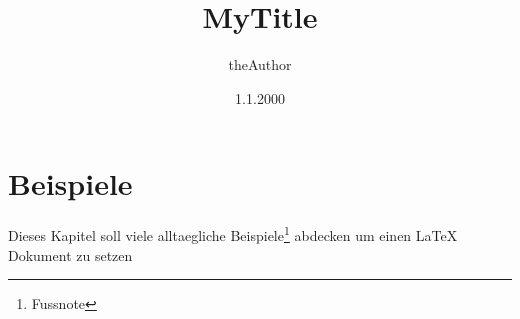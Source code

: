 \documentclass[a4paper,12pt,headsepline]{report}
\title{MyTitle}
\author{theAuthor}
\date{1.1.2000}
\begin{document}

 
 
 
 
 
\tableofcontents %

\listoffigures

\listoftables

\renewcommand{\lstlistlistingname}{Listingverzeichnis}
\lstlistoflistings

\pagestyle{plain} %




	


\chapter{Beispiele}
\label{cha:beispiele}
	Dieses Kapitel soll viele alltaegliche Beispiele\footnote{Fussnote} abdecken um einen {\LaTeX} Dokument zu setzen
\end{document}
